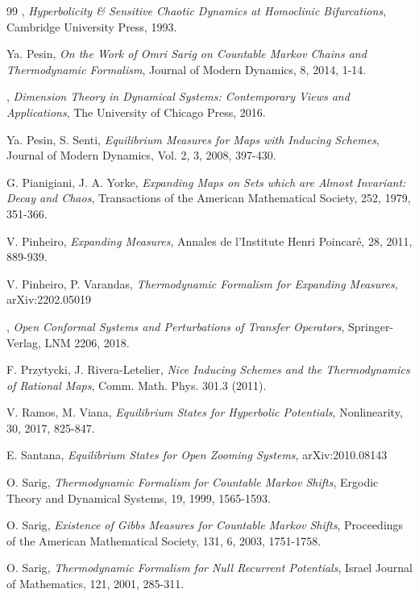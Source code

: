 \documentclass[12pt,a4paper]{amsart}
\theoremstyle{plain}
\begin{document}
\begin{thebibliography}{99}
	, {\it Hyperbolicity \& Sensitive Chaotic Dynamics at Homoclinic Bifurcations}, Cambridge University Press, 1993.
	
	
	 {\sc Ya. Pesin}, {\it On the Work of Omri Sarig on Countable Markov Chains and Thermodynamic Formalism}, Journal of Modern Dynamics, 8, 2014, 1-14.
	
	, {\it Dimension Theory in Dynamical Systems: Contemporary Views and Applications}, The University of Chicago Press, 2016.
	
	 {\sc Ya. Pesin, S. Senti}, {\it Equilibrium Measures for Maps with Inducing Schemes}, Journal of Modern Dynamics, Vol. 2, 3, 2008, 397-430.
	
	 {\sc G. Pianigiani, J. A. Yorke}, {\it Expanding Maps on Sets which are Almost Invariant: Decay and Chaos}, Transactions of the American Mathematical Society, 252, 1979, 351-366.
	
	 {\sc V. Pinheiro}, {\it Expanding Measures}, Annales de l'Institute Henri Poincar\' e, 28, 2011, 889-939.
	
	 {\sc V. Pinheiro, P. Varandas}, {\it Thermodynamic Formalism for Expanding Measures}, arXiv:2202.05019
	
	, {\it Open Conformal 	Systems and Perturbations of Transfer
		Operators}, Springer-Verlag, LNM 2206, 2018.
	
	 {\sc F. Przytycki, J. Rivera-Letelier}, {\it Nice Inducing Schemes and the Thermodynamics of Rational Maps}, Comm. Math. Phys. 301.3 (2011). 
	
	 {\sc V. Ramos, M. Viana}, {\it Equilibrium States for Hyperbolic Potentials}, Nonlinearity, 30, 2017, 825-847. 
	
	 {\sc E. Santana}, {\it Equilibrium States for Open Zooming Systems}, arXiv:2010.08143
	
	
	 {\sc O. Sarig}, {\it Thermodynamic Formalism for Countable Markov Shifts}, Ergodic Theory and Dynamical Systems, 19, 1999, 1565-1593. 
	
	 {\sc O. Sarig}, {\it Existence of Gibbs Measures for Countable Markov Shifts}, Proceedings of the American Mathematical Society, 131, 6, 2003, 1751-1758. 
	
	 {\sc O. Sarig}, {\it Thermodynamic Formalism for Null Recurrent Potentials}, Israel Journal of Mathematics, 121, 2001, 285-311. 
	

\end{thebibliography}
\end{document}
